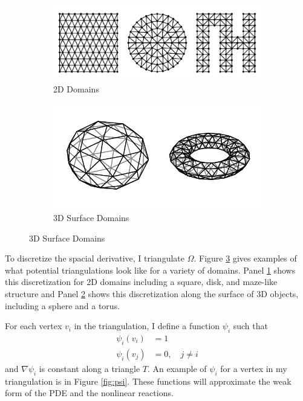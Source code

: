\begin{figure}[t!]
    \centering
    \caption{Triangulations of different domains}

    \begin{subfigure}{\textwidth}
        \centering
        \includegraphics{figures/2dtris.pdf}
        \caption{2D Domains}
        \label{subfig:2dtris}
    \end{subfigure}

    \begin{subfigure}{\textwidth}
        \centering
        \includegraphics{figures/3dtris.pdf}
        \caption{3D Surface Domains}
        \label{subfig:3dtris}
    \end{subfigure}

    \label{fig:tris}
\end{figure}

To discretize the spacial derivative, I triangulate $\Omega$. Figure \ref{fig:tris} gives examples of what potential triangulations look like for a variety of domains. Panel \ref{subfig:2dtris} shows this discretization for 2D domains including a square, disk, and maze-like structure and Panel \ref{subfig:3dtris} shows this discretization along the surface of 3D objects, including a sphere and a torus.

For each vertex $v_i$ in the triangulation, I define a function $\psi_i$ such that
\begin{align*}
    \psi_i (v_i) &= 1 \\
    \psi_i (v_j) &= 0, \quad j \neq i
\end{align*}
and $\nabla \psi_i$ is constant along a triangle $T$. An example of $\psi_i$ for a vertex in my triangulation is in Figure \ref{fig:psi}. These functions will approximate the weak form of the PDE and the nonlinear reactions.

